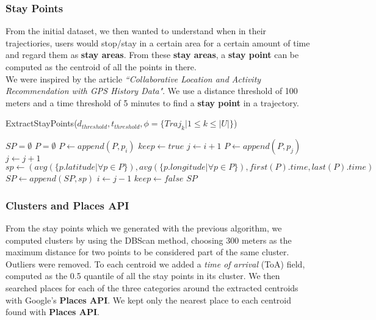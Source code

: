 \documentclass[../../main]{subfiles}
\begin{document}
\subsubsection{Stay Points}
\label{sss:stay-points}
From the initial dataset, we then wanted to understand when in their trajectiories, users would stop/stay in a certain area for a certain amount of time and regard them as \textbf{stay areas}.
From these \textbf{stay areas}, a \textbf{stay point} can be computed as the centroid of all the points in there.\\
We were inspired by the article \textit{``Collaborative Location and Activity Recommendation with GPS History Data"}. 
We use a distance threshold of 100 meters and a time threshold of 5 minutes to find a \textbf{stay point} in a trajectory.
\begin{algorithm}
    \caption{ExtractStayPoints($d_{threshold}, t_{threshold}, \phi{}=\{Traj_k | 1 \le{} k \le{} |U|\}$)}
    \begin{algorithmic}
        \STATE $SP = \emptyset$
                \STATE $P = \emptyset$
                \STATE $P \leftarrow{} append(P, p_i)$
                \STATE $keep \leftarrow{} true$
                \STATE $j \leftarrow{} i + 1$
                        \STATE $P \leftarrow{} append(P, p_j)$
                        \STATE $j \leftarrow{} j + 1$
                    \ELSE
                            \STATE $sp \leftarrow{} (avg(\{p.latitude | \forall{} p \in{} P\}), avg(\{p.longitude | \forall{} p \in{} P\}), first(P).time, last(P).time)$
                            \STATE $SP \leftarrow{} append(SP, sp)$
                            \STATE $i \leftarrow{} j - 1$
                        \ENDIF
                        \STATE $keep \leftarrow{} false$
                    \ENDIF
                \ENDWHILE
            \ENDFOR
        \ENDFOR
        \RETURN $SP$
    \end{algorithmic}
\end{algorithm}

\subsubsection{Clusters and Places API}
\label{sss:cluster}
From the stay points which we generated with the previous algorithm, we computed clusters by using the DBScan method, choosing 300 meters as the maximum distance for two points to be considered part of the same cluster.
Outliers were removed.
To each centroid we added a \textit{time of arrival} (ToA) field, computed as the 0.5 quantile of all the stay points in its cluster.
We then searched places for each of the three categories around the extracted centroids with Google's \textbf{Places API}.
We kept only the nearest place to each centroid found with \textbf{Places API}.
\end{document}

